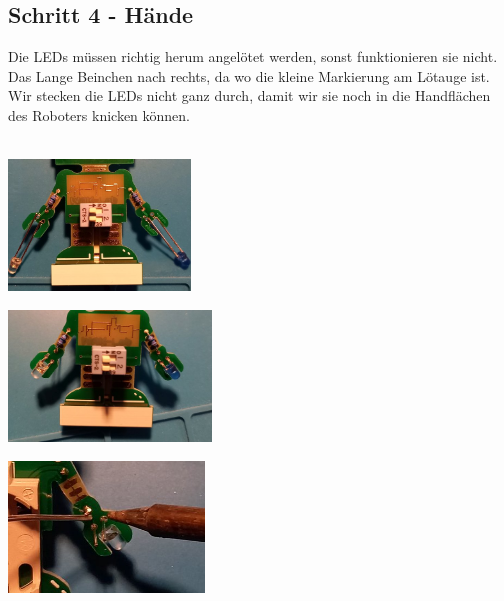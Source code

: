 \documentclass[a4paper]{article}
\begin{document}
\subsection{Schritt 4 - Hände}
Die LEDs müssen richtig herum angelötet werden, sonst funktionieren sie nicht. Das Lange Beinchen nach rechts, da wo die kleine Markierung am Lötauge ist.\\
Wir stecken die LEDs nicht ganz durch, damit wir sie noch in die Handflächen des Roboters knicken können.\\
\ \\
\begin{minipage}[t]{0.33\textwidth}
  \centering
  \includegraphics[height=3.5cm]{../pictures/LED1.jpg}
  \label{img:LED1}
  \end{minipage}
\begin{minipage}[t]{0.33\textwidth}
  \centering
  \includegraphics[height=3.5cm]{../pictures/LED2.jpg}
  \label{img:LED2}
\end{minipage}
\begin{minipage}[t]{0.33\textwidth}
  \centering
  \includegraphics[height=3.5cm]{../pictures/LED3.jpg}
  \label{img:LED3}
\end{minipage}
\end{document}

